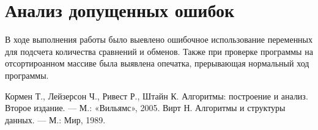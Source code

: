 \documentclass[a4paper,12pt,titlepage,finall]{article}
\begin{document}
\newpage

\section{Анализ допущенных ошибок}

В ходе выполнения работы было выевлено ошибочное использование переменных для подсчета количества сравнений и обменов. Также при проверке программы на отсортироанном массиве была выявлена опечатка, прерывающая нормальный ход программы. \par

\newpage
\begin{raggedright}
\begin{thebibliography}{99}
 Кормен Т., Лейзерсон Ч., Ривест Р., Штайн К. Алгоритмы: построение и анализ. Второе издание. — М.: «Вильямс», 2005.
 Вирт Н. Алгоритмы и структуры данных. — М.: Мир, 1989.
\end{thebibliography}
\end{raggedright}
\end{document}
